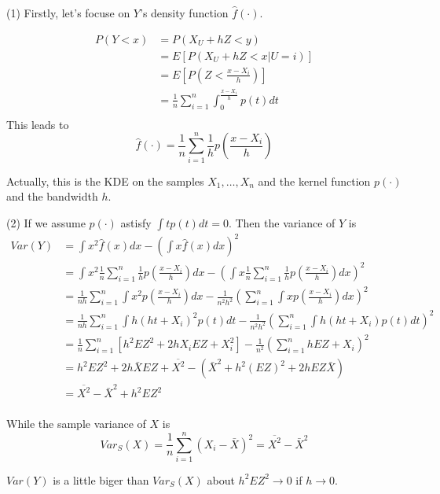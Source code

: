 \begin{solution}
    (1) Firstly, let's focuse on $Y$'s density function $\hat{f}(\cdot)$.

    \begin{equation*}
        \begin{split}
            P(Y < x) & = P(X_U + hZ < y) \\
            & = E\left[ P(X_U + hZ < x | U = i) \right] \\
            & = E \left[ P(Z < \frac{x-X_i}{h}) \right] \\
            & = \frac{1}{n} \sum_{i=1}^n \int_0^{\frac{x-X_i}{h}} p(t) dt \\
        \end{split}
    \end{equation*}
    This leads to 
    \begin{equation*}
        \hat{f}(\cdot) = \frac{1}{n} \sum_{i=1}^n \frac{1}{h} p\left( \frac{x-X_i}{h} \right) 
    \end{equation*}

    Actually, this is the KDE on the samples $X_1, \dots,X_n$ and the kernel function $p(\cdot)$ and the bandwidth $h$.
    
    (2) 
    If we assume $p(\cdot)$ astisfy $\int t p(t) dt = 0$. Then the variance of $Y$ is
    \begin{equation*}
        \begin{split}
            Var(Y) & = \int x^2 \hat{f}(x) dx - \left( \int x\hat{f}(x) dx \right)^2 \\
            & = \int x^2  \frac{1}{n} \sum_{i=1}^n \frac{1}{h} p\left( \frac{x-X_i}{h} \right) dx - \left( \int x  \frac{1}{n} \sum_{i=1}^n \frac{1}{h} p\left( \frac{x-X_i}{h} \right)  dx \right)^2 \\
            & = \frac{1}{nh} \sum_{i=1}^n \int x^2 p\left( \frac{x-X_i}{h} \right) dx - \frac{1}{n^2h^2} \left( \sum_{i=1}^n \int x  p\left( \frac{x-X_i}{h} \right)  dx \right)^2 \\
            & = \frac{1}{nh} \sum_{i=1}^n \int h (ht+X_i)^2 p(t) dt - \frac{1}{n^2h^2} \left( \sum_{i=1}^n \int h(ht+X_i)  p(t)  dt \right)^2 \\
            & = \frac{1}{n} \sum_{i=1}^n \left[ h^2 EZ^2 + 2hX_iEZ + X_i^2 \right] - \frac{1}{n^2}  \left( \sum_{i=1}^n hEZ + X_i \right)^2 \\
            & = h^2 EZ^2 + 2h\bar{X}EZ + \overline{X^2} - \left( \bar{X}^2  + h^2 (EZ)^2 + 2hEZ\bar{X} \right) \\
            & =  \overline{X^2} - \bar{X}^2 + h^2 EZ^2   \\
        \end{split}
    \end{equation*}

    While the sample variance of $X$ is
    \begin{equation*}
        Var_S(X) = \frac{1}{n} \sum_{i=1}^n \left( X_i - \bar{X} \right)^2 = \overline{X^2} - \bar{X}^2
    \end{equation*}

    $Var(Y)$ is a little biger than $Var_S(X)$ about $h^2 EZ^2 \to 0$ if $h\to0$.
\end{solution}